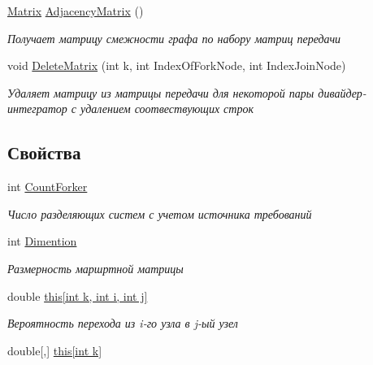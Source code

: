\begin{DoxyCompactItemize}
\hyperlink{class_b_l_a_s_1_1_matrix}{Matrix} \hyperlink{class_network_descriptions_1_1_routing_matrix_a8009ecda60ef6189dc09c016e4284fd8}{Adjacency\+Matrix} ()
\begin{DoxyCompactList}\small\item\em Получает матрицу смежности графа по набору матриц передачи \end{DoxyCompactList}\item 
void \hyperlink{class_network_descriptions_1_1_routing_matrix_a1a69e843795b875d926f77a298941c3c}{Delete\+Matrix} (int k, int Index\+Of\+Fork\+Node, int Index\+Join\+Node)
\begin{DoxyCompactList}\small\item\em Удаляет матрицу из матрицы передачи для некоторой пары дивайдер-\/интегратор с удалением соотвествующих строк \end{DoxyCompactList}\end{DoxyCompactItemize}
\subsection*{Свойства}
\begin{DoxyCompactItemize}
\item 
int \hyperlink{class_network_descriptions_1_1_routing_matrix_a38f3c4bb00bf84fdeb4fd2c3dbdc9bfb}{Count\+Forker}
\begin{DoxyCompactList}\small\item\em Число разделяющих систем с учетом источника требований \end{DoxyCompactList}\item 
int \hyperlink{class_network_descriptions_1_1_routing_matrix_a417bebac18f3b241d4e40d55d9b44213}{Dimention}
\begin{DoxyCompactList}\small\item\em Размерность маршртной матрицы \end{DoxyCompactList}\item 
double \hyperlink{class_network_descriptions_1_1_routing_matrix_a68455b0755e7b78a82759722a6154bb5}{this\mbox{[}int k, int i, int j\mbox{]}}
\begin{DoxyCompactList}\small\item\em Вероятность перехода из i-\/го узла в j-\/ый узел \end{DoxyCompactList}\item 
double\mbox{[},\mbox{]} \hyperlink{class_network_descriptions_1_1_routing_matrix_a9a42a8caf5362792a0a14f5db1572fd1}{this\mbox{[}int k\mbox{]}}
\end{DoxyCompactItemize}
